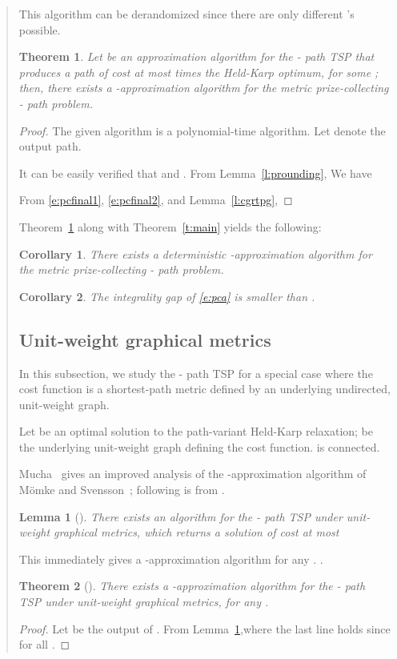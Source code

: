 \documentclass[11pt,letterpaper]{article}
\newtheorem{lemma}{Lemma}
\newtheorem{thm}{Theorem}
\newtheorem{cor}{Corollary}
\newcommand{\st}{\mbox{-} }
\begin{document}
\begin{quote}
This algorithm can be derandomized since there are only  different 's possible.

\begin{thm}\label{t:pcfinal}
Let  be an approximation algorithm for the \st path TSP that produces a path of cost at most  times the Held-Karp optimum, for some ; then, there exists a -approximation algorithm for the metric prize-collecting \st path problem.
\end{thm}
\begin{proof}
The given algorithm is a polynomial-time algorithm. Let  denote the output path.

It can be easily verified that  and . From Lemma~\ref{l:prounding},
We have

From \eqref{e:pcfinal1}, \eqref{e:pcfinal2}, and Lemma~\ref{l:cgrtpg},
\end{proof}

Theorem~\ref{t:pcfinal} along with Theorem~\ref{t:main} yields the following:
\begin{cor}
There exists a deterministic -approximation algorithm for the metric prize-collecting \st path problem.
\end{cor}

\begin{cor}
The integrality gap of \eqref{e:pca} is smaller than .
\end{cor}

\subsection{Unit-weight graphical metrics}\label{ss:unit}

In this subsection, we study the \st path TSP for a special case where the cost function is a shortest-path metric defined by an underlying undirected, unit-weight graph.

Let  be an optimal solution to the path-variant Held-Karp relaxation;  be the underlying unit-weight graph defining the cost function.  is connected.

Mucha~\cite{M} gives an improved analysis of the -approximation algorithm of M\"omke and Svensson~\cite{MS}; following is from \cite{M}.

\begin{lemma}[\cite{M}]\label{l:m}
There exists an algorithm  for the \st path TSP under unit-weight graphical metrics, which returns a solution of cost at most
\end{lemma}

This immediately gives a -approximation algorithm for any . .
\begin{thm}[\cite{M}]\label{t:m}
There exists a -approximation algorithm for the \st path TSP under unit-weight graphical metrics, for any .
\end{thm}
\begin{proof}
Let  be the output of . From Lemma~\ref{l:m},where the last line holds since  for all .


\end{proof}
\end{quote}
\end{document}

